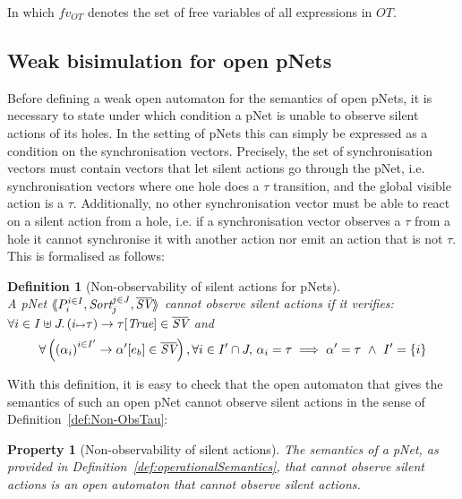 \documentclass{lmcs}
\newtheorem{definition}{Definition}
\newtheorem{property}{Property}
\begin{document}
In which $fv_{OT}$ denotes the set of free variables of all expressions in $OT$.
\subsection{Weak bisimulation for open pNets}

Before defining a weak open automaton for the semantics of open pNets,
it is necessary to state under which condition a pNet is unable to
observe silent actions of its holes. In the setting of pNets this can
simply be expressed as a condition on the synchronisation
vectors. Precisely, the set of synchronisation vectors must contain
vectors that let silent actions go through the pNet,
i.e. synchronisation vectors where one hole does a $\tau$ transition,
and the global visible action is a $\tau$. Additionally, no other
synchronisation vector must be able to react on a silent action from a
hole, i.e. if a synchronisation vector observes a $\tau$ from a hole
it cannot synchronise it with another action nor emit an action that
is not $\tau$. This is formalised as follows:



\begin{definition}[Non-observability of silent actions for pNets]\label{def:non-obspNet}~\\
A pNet $\mylangle \pNet_i^{i\in I} , \Sort_j^{j\in J}, \set{\symb{SV}}\myrangle$
 \emph{cannot observe silent actions} if it verifies:\\ $\forall i\in I\uplus J.\, \SV{(i\mapsto \tau)}{\tau}{\True}\in \set{\symb{SV}}$ and 
\begin{equation*}
\forall \left(\SV{{(\alpha_i)}^{i\in I'}} 
{\alpha'} 
{e_b}\in \set{\symb{SV}}\right), %
\forall i\in I'\cap J,\, \alpha_i=\tau \implies %
\alpha'=\tau ~\land~ %
I'=\{i\}
\end{equation*}
\end{definition}

With this definition, it is easy to check that the open automaton that gives the semantics of such an open pNet cannot observe silent actions in the sense of Definition~\ref{def:Non-ObsTau}:

\begin{property}[Non-observability of silent actions]
The  semantics of a pNet, as provided in Definition~\ref{def:operationalSemantics}, that cannot observe silent actions is an open automaton that  cannot observe silent actions.
\end{property}
\end{document}
